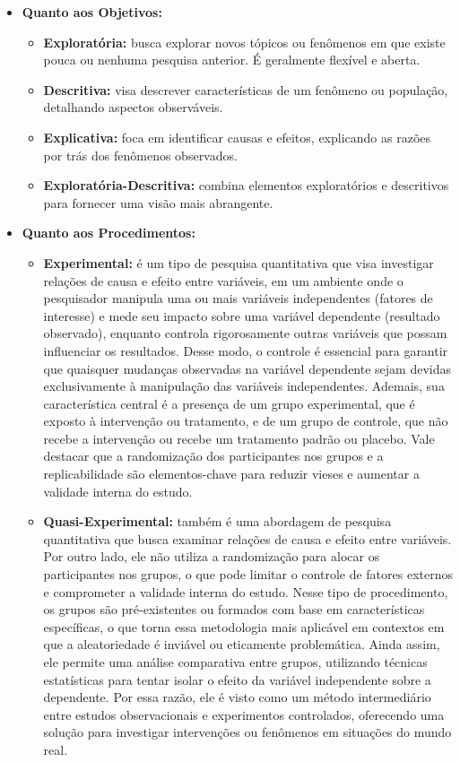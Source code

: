 \begin{itemize}[nosep, leftmargin=2.3cm]
    \item \textbf{Quanto aos Objetivos:}
        \begin{itemize}[nosep]
            \item \textbf{Exploratória:} busca explorar novos tópicos ou fenômenos em que existe pouca ou nenhuma pesquisa anterior. É geralmente flexível e aberta.
            \item \textbf{Descritiva:} visa descrever características de um fenômeno ou população, detalhando aspectos observáveis.
            \item \textbf{Explicativa:} foca em identificar causas e efeitos, explicando as razões por trás dos fenômenos observados.
            \item \textbf{Exploratória-Descritiva:} combina elementos exploratórios e descritivos para fornecer uma visão mais abrangente.
        \end{itemize}
    \item \textbf{Quanto aos Procedimentos:}
        \begin{itemize}[nosep]
            \item \textbf{Experimental:} é um tipo de pesquisa quantitativa que visa investigar relações de causa e efeito entre variáveis, em um ambiente onde o pesquisador manipula uma ou mais variáveis independentes (fatores de interesse) e mede seu impacto sobre uma variável dependente (resultado observado), enquanto controla rigorosamente outras variáveis que possam influenciar os resultados. Desse modo, o controle é essencial para garantir que quaisquer mudanças observadas na variável dependente sejam devidas exclusivamente à manipulação das variáveis independentes. Ademais, sua característica central é a presença de um grupo experimental, que é exposto à intervenção ou tratamento, e de um grupo de controle, que não recebe a intervenção ou recebe um tratamento padrão ou placebo. Vale destacar que a randomização dos participantes nos grupos e a replicabilidade são elementos-chave para reduzir vieses e aumentar a validade interna do estudo.
            \item \textbf{Quasi-Experimental:} também é uma abordagem de pesquisa quantitativa que busca examinar relações de causa e efeito entre variáveis. Por outro lado, ele não utiliza a randomização para alocar os participantes nos grupos, o que pode limitar o controle de fatores externos e comprometer a validade interna do estudo. Nesse tipo de procedimento, os grupos são pré-existentes ou formados com base em características específicas, o que torna essa metodologia mais aplicável em contextos em que a aleatoriedade é inviável ou eticamente problemática. Ainda assim, ele permite uma análise comparativa entre grupos, utilizando técnicas estatísticas para tentar isolar o efeito da variável independente sobre a dependente. Por essa razão, ele é visto como um método intermediário entre estudos observacionais e experimentos controlados, oferecendo uma solução para investigar intervenções ou fenômenos em situações do mundo real.

\end{itemize}
\end{itemize}
